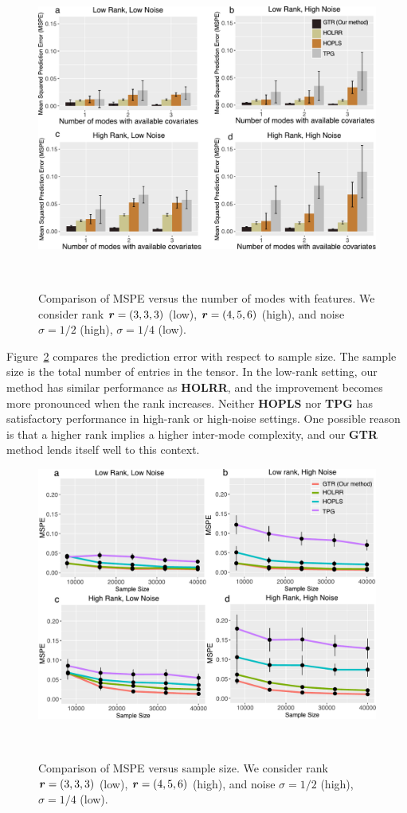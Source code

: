 \documentclass[12pt]{article}
\theoremstyle{plain}
\theoremstyle{definition}
\begin{document}
\begin{figure}[ht]
\centering
\includegraphics[width=12cm]{merge.pdf} 

\caption{Comparison of MSPE versus the number of modes with features. We consider rank $\bm{r}=(3,3,3)$ (low), $\bm{r}=(4,5,6)$ (high), and noise $\sigma=1/2$ (high), $\sigma=1/4$ (low).}~\label{fig:compare}

\end{figure}


Figure~\ref{fig:compare2} compares the prediction error with respect to sample size. The sample size is the total number of entries in the tensor. In the low-rank setting, our method has similar performance as {\bf HOLRR}, and the improvement becomes more pronounced when the rank increases. Neither {\bf HOPLS} nor {\bf TPG} has satisfactory performance in high-rank or high-noise settings. One possible reason is that a higher rank implies a higher inter-mode complexity, and our {\bf GTR} method lends itself well to this context. 


\begin{figure}[ht]
\centering
\includegraphics[width=12cm]{merge2.pdf} 

\caption{Comparison of MSPE versus sample size. We consider rank $\bm{r}=(3,3,3)$ (low), $\bm{r}=(4,5,6)$ (high), and noise $\sigma=1/2$ (high), $\sigma=1/4$ (low). }~\label{fig:compare2}

\end{figure}
\end{document}
